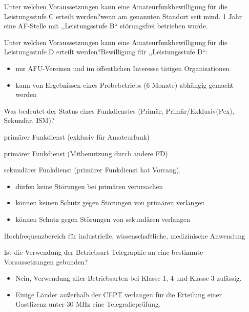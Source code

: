 \documentclass[avery5371,grid,frame,a4paper]{flashcards}
\newcommand{\card}[3]{
  \begin{flashcard}[{\chap} -- #1]{#2}#3\end{flashcard}
}
\begin{document}
\card{43}{Unter welchen Voraussetzungen kann eine Amateurfunkbewilligung für die Leistungsstufe C erteilt werden?}{wenn am genannten Standort seit mind. 1 Jahr eine AF-Stelle mit ,,Leistungsstufe B`` störungsfrei betrieben wurde.}

\card{44}{Unter welchen Voraussetzungen kann eine Amateurfunkbewilligung für die Leistungsstufe D erteilt werden?}{Bewilligung für ,,Leistungsstufe D``: \begin{itemize}\itemsep1pt \item nur AFU-Vereinen und im öffentlichen Interesse tätigen Organisationen \item kann von Ergebnissen eines Probebetriebs (6 Monate) abhängig gemacht werden\end{itemize}}

\card{45}{Was bedeutet der Status eines Funkdienstes (Primär, Primär/Exklusiv(Pex), Sekundär, ISM)?}{
 \footnotesize
  \begin{description}\itemsep0pt
    \item[Pex] primärer Funkdienst (exklusiv für Amateurfunk)
    \item[P] primärer Funkdienst (Mitbenutzung durch andere FD)
    \item[S] sekundärer Funkdienst (primärer Funkdienst hat Vorrang),
      \begin{itemize}[leftmargin=0pt,itemsep=0pt]
        \item dürfen keine Störungen bei primären verursachen
        \item können keinen Schutz gegen Störungen von primären verlangen
        \item können Schutz gegen Störungen von sekundären verlangen
      \end{itemize}
    \item[ISM] Hochfrequenzbereich für industrielle, wissenschaftliche, medizinische Anwendung
  \end{description}
}

\card{46}{Ist die Verwendung der Betriebsart Telegraphie an eine bestimmte Voraussetzungen gebunden?}{\begin{itemize}\itemsep1pt \item Nein, Verwendung aller Betriebsarten bei Klasse 1, 4 und Klasse 3 zulässig. \item Einige Länder außerhalb der CEPT verlangen für die Erteilung einer Gastlizenz
unter 30 MHz eine Telegrafieprüfung.\end{itemize}}
\end{document}
